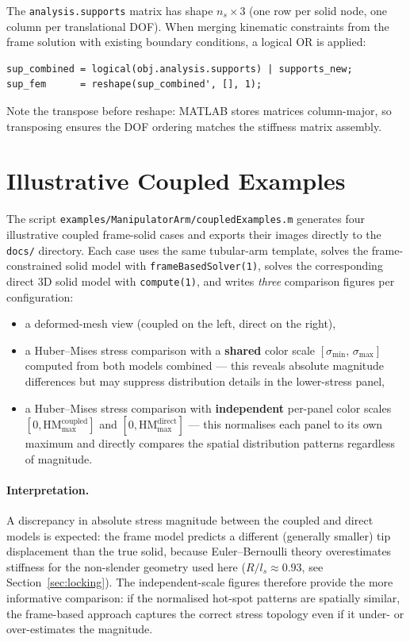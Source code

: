 \documentclass{article}
\begin{document}
The \texttt{analysis.supports} matrix has shape $n_s \times 3$ (one row per
solid node, one column per translational DOF).  When merging kinematic
constraints from the frame solution with existing boundary conditions, a
logical OR is applied:
\begin{lstlisting}[caption={Combining original and kinematic supports}]
sup_combined = logical(obj.analysis.supports) | supports_new;
sup_fem      = reshape(sup_combined', [], 1);
\end{lstlisting}
Note the transpose before reshape: MATLAB stores matrices column-major, so
transposing ensures the DOF ordering matches the stiffness matrix assembly.

\section{Illustrative Coupled Examples}
\label{sec:examples}

The script \texttt{examples/ManipulatorArm/coupledExamples.m} generates four
illustrative coupled frame-solid cases and exports their images directly to
the \texttt{docs/} directory.  Each case uses the same tubular-arm template,
solves the frame-constrained solid model with \texttt{frameBasedSolver(1)},
solves the corresponding direct 3D solid model with \texttt{compute(1)}, and
writes \emph{three} comparison figures per configuration:
\begin{itemize}
    \item a deformed-mesh view (coupled on the left, direct on the right),
    \item a Huber--Mises stress comparison with a \textbf{shared} color scale
          $[\sigma_{\min},\,\sigma_{\max}]$ computed from both models combined
          — this reveals absolute magnitude differences but may suppress
          distribution details in the lower-stress panel,
    \item a Huber--Mises stress comparison with \textbf{independent} per-panel
          color scales $[0, \mathrm{HM}_{\max}^{\text{coupled}}]$ and
          $[0, \mathrm{HM}_{\max}^{\text{direct}}]$ — this normalises each
          panel to its own maximum and directly compares the spatial
          distribution patterns regardless of magnitude.
\end{itemize}

\paragraph{Interpretation.}
A discrepancy in absolute stress magnitude between the coupled and direct
models is expected: the frame model predicts a different (generally smaller)
tip displacement than the true solid, because Euler--Bernoulli theory
overestimates stiffness for the non-slender geometry used here
($R/l_s \approx 0.93$, see Section~\ref{sec:locking}).  The independent-scale
figures therefore provide the more informative comparison: if the normalised
hot-spot patterns are spatially similar, the frame-based approach captures the
correct stress topology even if it under- or over-estimates the magnitude.
\end{document}

